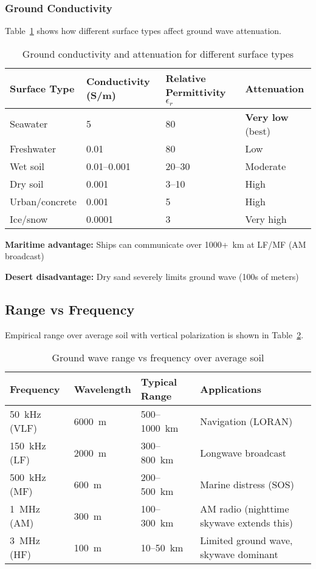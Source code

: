 \subsubsection{Ground Conductivity}

Table~\ref{tab:ground-conductivity} shows how different surface types affect ground wave attenuation.

\begin{table}[htbp]
\centering
\caption{Ground conductivity and attenuation for different surface types}
\label{tab:ground-conductivity}
\begin{tabular}{@{}lp{2.5cm}p{2.5cm}p{2.5cm}@{}}
\toprule
\textbf{Surface Type} & \textbf{Conductivity (S/m)} & \textbf{Relative Permittivity $\epsilon_r$} & \textbf{Attenuation} \\
\midrule
Seawater & 5 & 80 & \textbf{Very low} (best) \\
Freshwater & 0.01 & 80 & Low \\
Wet soil & 0.01--0.001 & 20--30 & Moderate \\
Dry soil & 0.001 & 3--10 & High \\
Urban/concrete & 0.001 & 5 & High \\
Ice/snow & 0.0001 & 3 & Very high \\
\bottomrule
\end{tabular}
\end{table}

\textbf{Maritime advantage:} Ships can communicate over 1000+~km at LF/MF (AM broadcast)

\textbf{Desert disadvantage:} Dry sand severely limits ground wave (100s of meters)

\subsection{Range vs Frequency}

Empirical range over average soil with vertical polarization is shown in Table~\ref{tab:ground-wave-range}.

\begin{table}[htbp]
\centering
\caption{Ground wave range vs frequency over average soil}
\label{tab:ground-wave-range}
\begin{tabular}{@{}lllp{4.5cm}@{}}
\toprule
\textbf{Frequency} & \textbf{Wavelength} & \textbf{Typical Range} & \textbf{Applications} \\
\midrule
50~kHz (VLF) & 6000~m & 500--1000~km & Navigation (LORAN) \\
150~kHz (LF) & 2000~m & 300--800~km & Longwave broadcast \\
500~kHz (MF) & 600~m & 200--500~km & Marine distress (SOS) \\
1~MHz (AM) & 300~m & 100--300~km & AM radio (nighttime skywave extends this) \\
3~MHz (HF) & 100~m & 10--50~km & Limited ground wave, skywave dominant \\
\bottomrule
\end{tabular}
\end{table}

